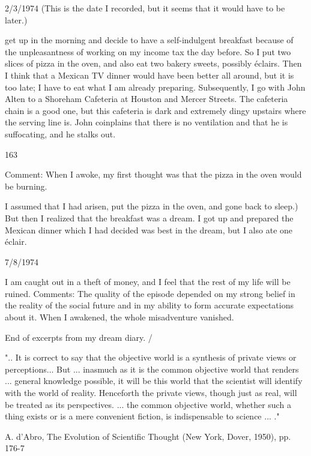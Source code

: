 \documentclass[10pt,twoside]{memoir}
\begin{document}
\begin{enumerate}
{{2/3/1974 (This is the date I recorded, but it seems that it would have to be 
later.) 

} get up in the morning and decide to have a self-indulgent breakfast 
because of the unpleasantness of working on my income tax the day before. 
So I put two slices of pizza in the oven, and also eat two bakery sweets, 
possibly éclairs. Then I think that a Mexican TV dinner would have been 
better all around, but it is too late; I have to eat what I am already preparing. 
Subsequently, I go with John Alten to a Shoreham Cafeteria at Houston and 
Mercer Streets. The cafeteria chain is a good one, but this cafeteria is dark 
and extremely dingy upstairs where the serving line is. John coinplains that 
there is no ventilation and that he is suffocating, and he stalks out. 


163 


Comment: When I awoke, my first thought was that the pizza in the oven 
would be burning. {I assumed that I had arisen, put the pizza in the oven, 
and gone back to sleep.) But then I realized that the breakfast was a dream. I 
got up and prepared the Mexican dinner which I had decided was best in the 
dream, but I also ate one éclair. 


7/8/1974 

I am caught out in a theft of money, and I feel that the rest of my life 
will be ruined. Comments: The quality of the episode depended on my 
strong belief in the reality of the social future and in my ability to form 
accurate expectations about it. When I awakened, the whole misadventure 
vanished. 


End of excerpts from my dream diary. / 


".. It is correct to say that the objective world is a synthesis of private views 
or perceptions... But ... inasmuch as it is the common objective world that 
renders ... general knowledge possible, it will be this world that the scientist 
will identify with the world of reality. Henceforth the private views, though 
just as real, will be treated as its perspectives. ... the common objective 
world, whether such a thing exists or is a mere convenient fiction, is 
indispensable to science ... ." 

A. d'Abro, The Evolution of Scientific Thought (New York, Dover, 1950), 
pp. 176-7 


}}
\end{enumerate}
\end{document}
